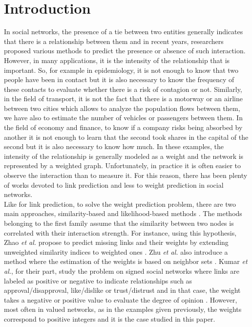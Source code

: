 \section{Introduction}


In social networks, the presence of a tie between two entities generally indicates that there is a relationship between them and in recent years, researchers proposed various methods to predict the presence or absence of such interaction. However, in many applications, it is the intensity of the relationship that is important. So, for example in epidemiology, it is not enough to know that two people have been in contact but it is also necessary to know the frequency of these contacts to evaluate whether there is a risk of contagion or not. Similarly, in the field of transport, it is not the fact that there is a motorway or an airline between two cities which allows to analyze the population flows between them, we have also  to estimate the number of vehicles or passengers between them. In the field of economy and finance, to know if a company risks being absorbed by another it is not enough to learn that the second took shares in the capital of the second but it is also necessary to know how much.  In these examples, the intensity of the relationship is generally modeled as a weight and the network is represented by a weighted graph.   Unfortunately, in practice it is often easier to observe the interaction than to measure it. 
For this reason, there has been plenty of works devoted to link prediction \cite{Liben2007,Zaki2011,Martinez2016} and less to weight prediction in social networks.\\
Like for link prediction, to solve the weight prediction problem, there are two main approaches, similarity-based and likelihood-based methods \cite{Lu2011}. The methods belonging to the first family assume that the similarity between two nodes is correlated with their interaction strength. For instance, using this hypothesis, Zhao \textit{et al.} propose to predict missing links and their weights by extending unweighted similarity indices to weighted ones \cite{Zhao2015}. Zhu \textit{et al.} also introduce a method where the estimation of the weights is based on neighbor sets \cite{Zhu2016}. Kumar \textit{et al.}, for their part, study the problem on signed social networks where links are labeled as positive or negative to indicate relationships such as approval/disapproval, like/dislike or trust/distrust and in that case, the weight takes  a negative or  positive value to evaluate the degree of opinion \cite{Kumar2016}. However, most often in valued networks, as in the examples given previously,  the  weights correspond to positive integers and it is the case studied in this paper.\\
